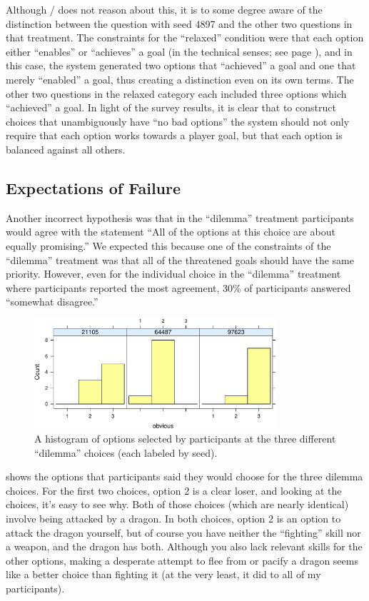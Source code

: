 Although \dunyazad/ does not reason about this, it is to some degree aware of the distinction between the question with seed 4897 and the other two questions in that treatment.
%
The constraints for the ``relaxed'' condition were that each option either ``enables'' or ``achieves'' a goal (in the technical senses; see page \pageref{page:choicetypes}), and in this case, the system generated two options that ``achieved'' a goal and one that merely ``enabled'' a goal, thus creating a distinction even on its own terms.
%
The other two questions in the relaxed category each included three options which ``achieved'' a goal.
%
In light of the survey results, it is clear that to construct choices that unambiguously have ``no bad options'' the system should not only require that each option works towards a player goal, but that each option is balanced against all others.


\subsection{Expectations of Failure}

Another incorrect hypothesis was that in the ``dilemma'' treatment participants would agree with the statement ``All of the options at this choice are about equally promising.''
%
We expected this because one of the constraints of the ``dilemma'' treatment was that all of the threatened goals should have the same priority.
%
However, even for the individual choice in the ``dilemma'' treatment where participants reported the most agreement, 30\% of participants answered ``somewhat disagree.'' 


\begin{figure}[!h]
  \centering
  \includegraphics[width=0.8\textwidth,page=3]{fig/choices-cropped.pdf}
  \caption{A histogram of options selected by participants at the three different ``dilemma'' choices (each labeled by seed).}
  \label{fig:dilchoices}
\end{figure}


 shows the options that participants said they would choose for the three dilemma choices.
%
For the first two choices, option 2 is a clear loser, and looking at the choices, it's easy to see why.
%
Both of those choices (which are nearly identical) involve being attacked by a dragon.
%
In both choices, option 2 is an option to attack the dragon yourself, but of course you have neither the ``fighting'' skill nor a weapon, and the dragon has both.
%
Although you also lack relevant skills for the other options, making a desperate attempt to flee from or pacify a dragon seems like a better choice than fighting it (at the very least, it did to all of my participants).


